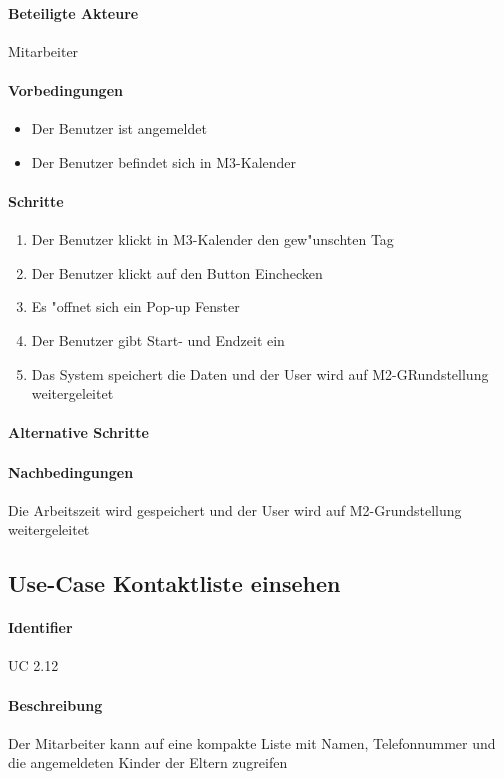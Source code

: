   \paragraph{Beteiligte Akteure}   \leavevmode \newline
    Mitarbeiter
  \paragraph{Vorbedingungen}
  \begin{itemize}
   \item Der Benutzer ist angemeldet
   \item Der Benutzer befindet sich in M3-Kalender
  \end{itemize}

  \paragraph{Schritte}
  \begin{enumerate}
   \item Der Benutzer klickt in M3-Kalender den gew"unschten Tag
   \item Der Benutzer klickt auf den Button \dq Einchecken\dq
   \item Es "offnet sich ein Pop-up Fenster
   \item Der Benutzer gibt Start- und Endzeit ein
   \item Das System speichert die Daten und der User wird auf M2-GRundstellung weitergeleitet
  \end{enumerate}

  \paragraph{Alternative Schritte}
  \paragraph{Nachbedingungen}
  Die Arbeitszeit wird gespeichert und der User wird auf M2-Grundstellung weitergeleitet
  
  \newpage
  \subsection{Use-Case Kontaktliste einsehen}
  \paragraph{Identifier}
  UC 2.12
  \paragraph{Beschreibung}
  Der Mitarbeiter kann auf eine kompakte Liste mit Namen, Telefonnummer und die angemeldeten Kinder der Eltern zugreifen 
